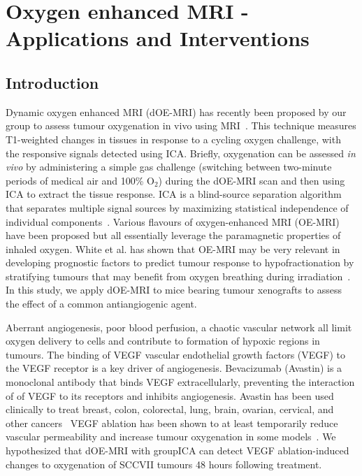 
\chapter{Oxygen enhanced MRI - Applications and Interventions}
\label{ch:oemri3}

\section{Introduction}

Dynamic oxygen enhanced MRI (\ac{dOE-MRI}) has recently been proposed by our group to assess tumour oxygenation in vivo using MRI~\cite{Moosvi:2018ca}. 
This technique measures T1-weighted changes in tissues in response to a cycling oxygen challenge, with the responsive signals detected using \ac{ICA}. 
Briefly, oxygenation can be assessed \emph{in vivo} by administering a simple gas challenge (switching between two-minute periods of medical air and 100\% O$_2$) during the \ac{dOE-MRI} scan and then using \ac{ICA} to extract the tissue response.
\ac{ICA} is a blind-source separation algorithm that separates multiple signal sources by maximizing statistical independence of individual components~\cite{Hyvarinen:2000vk}.
Various flavours of oxygen-enhanced MRI (OE-MRI) have been proposed but all essentially leverage the paramagnetic properties of inhaled oxygen.
White et al. has shown that OE-MRI may be very relevant in developing prognostic factors to predict tumour response to hypofractionation by stratifying tumours that may benefit from oxygen breathing during irradiation~\cite{White:2016fz}.
In this study, we apply \ac{dOE-MRI} to mice bearing tumour xenografts to assess the effect of a common antiangiogenic agent.

Aberrant angiogenesis, poor blood perfusion, a chaotic vascular network all limit oxygen delivery to cells and contribute to formation of hypoxic regions in tumours.
The binding of \ac{VEGF} vascular endothelial growth factors (VEGF) to the VEGF receptor is a key driver of angiogenesis.
Bevacizumab (Avastin) is a monoclonal antibody that binds VEGF extracellularly, preventing the interaction of of VEGF to its receptors and inhibits angiogenesis. 
Avastin has been used clinically to treat breast, colon, colorectal, lung, brain, ovarian, cervical, and other cancers~\cite{AvastinIndications}%
VEGF ablation has been shown to at least temporarily reduce vascular permeability and increase tumour oxygenation in some models~\cite{OConnor:2012iea}. 
We hypothesized that \ac{dOE-MRI} with group\ac{ICA} can detect VEGF ablation-induced changes to oxygenation of SCCVII tumours 48 hours following treatment.

